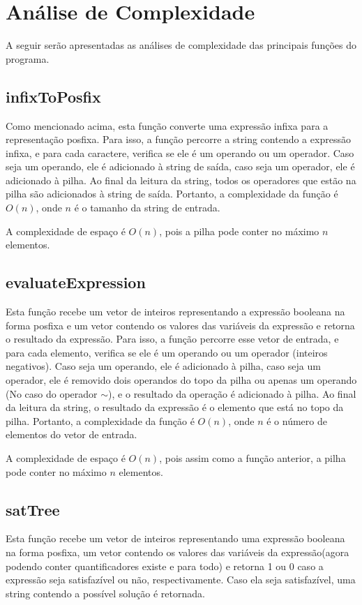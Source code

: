 \documentclass{article}
\begin{document}
\section{Análise de Complexidade}

A seguir serão apresentadas as análises de complexidade das principais funções do programa.

\subsection{infixToPosfix}
Como mencionado acima, esta função converte uma expressão infixa para a representação posfixa. Para isso, a função percorre a string contendo a expressão infixa, e para cada caractere, verifica se ele é um operando ou um operador. Caso seja um operando, ele é adicionado à string de saída, caso seja um operador, ele é adicionado à pilha. Ao final da leitura da string, todos os operadores que estão na pilha são adicionados à string de saída. Portanto, a complexidade da função é $O(n)$, onde $n$ é o tamanho da string de entrada.

A complexidade de espaço é $O(n)$, pois a pilha pode conter no máximo $n$ elementos.

\subsection{evaluateExpression}
Esta função recebe um vetor de inteiros representando a expressão booleana na forma posfixa e um vetor contendo os valores das variáveis da expressão e retorna o resultado da expressão. Para isso, a função percorre esse vetor de entrada, e para cada elemento, verifica se ele é um operando ou um operador (inteiros negativos). Caso seja um operando, ele é adicionado à pilha, caso seja um operador, ele é removido dois operandos do topo da pilha ou apenas um operando (No caso do operador $\sim$), e o resultado da operação é adicionado à pilha. Ao final da leitura da string, o resultado da expressão é o elemento que está no topo da pilha. Portanto, a complexidade da função é $O(n)$, onde $n$ é o número de elementos do vetor de entrada.

A complexidade de espaço é $O(n)$, pois assim como a função anterior, a pilha pode conter no máximo $n$ elementos.

\subsection{satTree}
Esta função recebe um vetor de inteiros representando uma expressão booleana na forma posfixa, um vetor contendo os valores das variáveis da expressão(agora podendo conter quantificadores existe e para todo) e retorna 1 ou 0 caso a expressão seja satisfazível ou não, respectivamente. Caso ela seja satisfazível, uma string contendo a possível solução é retornada. 
\end{document}
